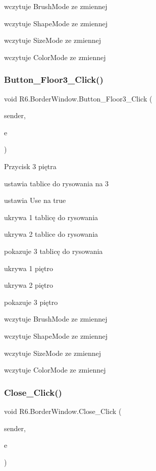 wczytuje Brush\+Mode ze zmiennej 

wczytuje Shape\+Mode ze zmiennej 

wczytuje Size\+Mode ze zmiennej 

wczytuje Color\+Mode ze zmiennej \mbox{\label{class_r6_1_1_border_window_a0a3bf7cdcdd8accd8390e38c2f78c48a}} 
\subsubsection{\texorpdfstring{Button\_Floor3\_Click()}{Button\_Floor3\_Click()}}
{\footnotesize\ttfamily void R6.\+Border\+Window.\+Button\+\_\+\+Floor3\+\_\+\+Click (\begin{DoxyParamCaption}\item[{object}]{sender,  }\item[{Routed\+Event\+Args}]{e }\end{DoxyParamCaption})\hspace{0.3cm}{\ttfamily [private]}}



Przycisk 3 piętra 

ustawia tablice do rysowania na 3 

ustawia Use na true 

ukrywa 1 tablicę do rysowania 

ukrywa 2 tablice do rysowania 

pokazuje 3 tablicę do rysowania 

ukrywa 1 piętro 

ukrywa 2 piętro 

pokazuje 3 piętro 

wczytuje Brush\+Mode ze zmiennej 

wczytuje Shape\+Mode ze zmiennej 

wczytuje Size\+Mode ze zmiennej 

wczytuje Color\+Mode ze zmiennej \mbox{\label{class_r6_1_1_border_window_a553e12d8cc547080bdf44c3c8972025a}} 
\subsubsection{\texorpdfstring{Close\_Click()}{Close\_Click()}}
{\footnotesize\ttfamily void R6.\+Border\+Window.\+Close\+\_\+\+Click (\begin{DoxyParamCaption}\item[{object}]{sender,  }\item[{Routed\+Event\+Args}]{e }\end{DoxyParamCaption})\hspace{0.3cm}{\ttfamily [private]}}



